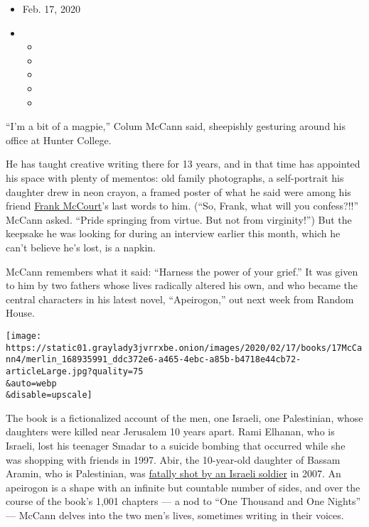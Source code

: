 \begin{itemize}
\item
  Feb. 17, 2020
\item
  \begin{itemize}
  \item
  \item
  \item
  \item
  \item
  \end{itemize}
\end{itemize}

``I'm a bit of a magpie,'' Colum McCann said, sheepishly gesturing
around his office at Hunter College.

He has taught creative writing there for 13 years, and in that time has
appointed his space with plenty of mementos: old family photographs, a
self-portrait his daughter drew in neon crayon, a framed poster of what
he said were among his friend
\href{https://www.nytimes3xbfgragh.onion/2009/07/20/books/20mccourt.html}{Frank
McCourt}'s last words to him. (``So, Frank, what will you confess?!!''
McCann asked. ``Pride springing from virtue. But not from virginity!'')
But the keepsake he was looking for during an interview earlier this
month, which he can't believe he's lost, is a napkin.

McCann remembers what it said: ``Harness the power of your grief.'' It
was given to him by two fathers whose lives radically altered his own,
and who became the central characters in his latest novel,
``Apeirogon,'' out next week from Random House.

\texttt{[image: https://static01.graylady3jvrrxbe.onion/images/2020/02/17/books/17McCann4/merlin\_168935991\_ddc372e6-a465-4ebc-a85b-b4718e44cb72-articleLarge.jpg?quality=75\\\&auto=webp\\\&disable=upscale]}

The book is a fictionalized account of the men, one Israeli, one
Palestinian, whose daughters were killed near Jerusalem 10 years apart.
Rami Elhanan, who is Israeli, lost his teenager Smadar to a suicide
bombing that occurred while she was shopping with friends in 1997. Abir,
the 10-year-old daughter of Bassam Aramin, who is Palestinian, was
\href{https://www.nytimes3xbfgragh.onion/2020/01/09/movies/afterward-review.html}{fatally
shot by an Israeli soldier} in 2007. An apeirogon is a shape with an
infinite but countable number of sides, and over the course of the
book's 1,001 chapters --- a nod to ``One Thousand and One Nights'' ---
McCann delves into the two men's lives, sometimes writing in their
voices.

